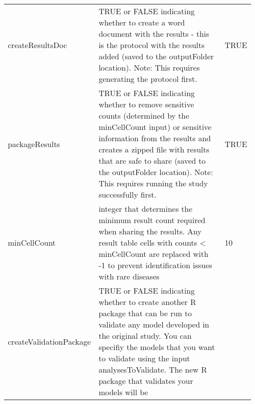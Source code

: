 \documentclass[
]{article}
\begin{document}
\begin{longtable}[]{@{}lll@{}}
\begin{minipage}[t]{0.21\columnwidth}
createResultsDoc\strut
\end{minipage} & \begin{minipage}[t]{0.46\columnwidth}\raggedright
TRUE or FALSE indicating whether to create a word document with the
results - this is the protocol with the results added (saved to the
outputFolder location). Note: This requires generating the protocol
first.\strut
\end{minipage} & \begin{minipage}[t]{0.24\columnwidth}\raggedright
TRUE\strut
\end{minipage}\tabularnewline
\begin{minipage}[t]{0.21\columnwidth}\raggedright
packageResults\strut
\end{minipage} & \begin{minipage}[t]{0.46\columnwidth}\raggedright
TRUE or FALSE indicating whether to remove sensitive counts (determined
by the minCellCount input) or sensitive information from the results and
creates a zipped file with results that are safe to share (saved to the
outputFolder location). Note: This requires running the study
successfully first.\strut
\end{minipage} & \begin{minipage}[t]{0.24\columnwidth}\raggedright
TRUE\strut
\end{minipage}\tabularnewline
\begin{minipage}[t]{0.21\columnwidth}\raggedright
minCellCount\strut
\end{minipage} & \begin{minipage}[t]{0.46\columnwidth}\raggedright
integer that determines the minimum result count required when sharing
the results. Any result table cells with counts \textless{} minCellCount
are replaced with -1 to prevent identification issues with rare
diseases\strut
\end{minipage} & \begin{minipage}[t]{0.24\columnwidth}\raggedright
10\strut
\end{minipage}\tabularnewline
\begin{minipage}[t]{0.21\columnwidth}\raggedright
createValidationPackage\strut
\end{minipage} & \begin{minipage}[t]{0.46\columnwidth}\raggedright
TRUE or FALSE indicating whether to create another R package that can be
run to validate any model developed in the original study. You can
specifiy the models that you want to validate using the input
analysesToValidate. The new R package that validates your models will be

\end{minipage}
\end{longtable}
\end{document}
